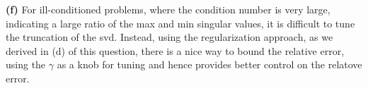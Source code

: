 \documentclass{article}
\renewcommand\part[1]{\vspace{.10in}\textbf{(#1)}}
\begin{document}
 \part{f} 
   For ill-conditioned problems, where the condition number is very large, indicating a large ratio of the max and min singular values, it is difficult to tune the truncation of the svd. Instead, using the regularization approach, as we derived in (d) of this question, there is a nice way to bound the relative error, using the $\gamma$ as a knob for tuning and hence provides better control on the relatove error. \newline
\end{document}
